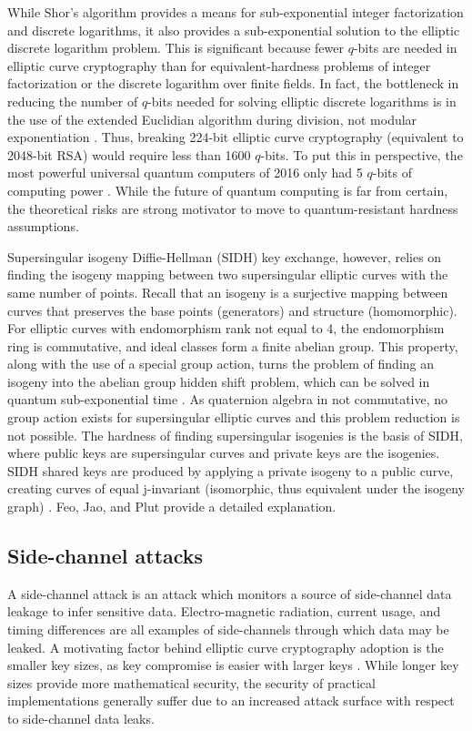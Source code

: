 \documentclass{article}
\begin{document}
    While Shor's algorithm provides a means for sub-exponential integer
    factorization and discrete logarithms, it also provides a sub-exponential
    solution to the elliptic discrete logarithm problem. This is significant
    because fewer $q$-bits are needed in elliptic curve cryptography than for
    equivalent-hardness problems of integer factorization or the discrete
    logarithm over finite fields. In fact, the bottleneck in reducing the
    number of $q$-bits needed for solving elliptic discrete logarithms is in
    the use of the extended Euclidian algorithm during division, not modular
    exponentiation \cite{proos}.  Thus, breaking 224-bit elliptic curve
    cryptography (equivalent to 2048-bit RSA) would require less than 1600
    $q$-bits. To put this in perspective, the most powerful universal quantum
    computers of 2016 only had 5 $q$-bits of computing power \cite{ibm}. While
    the future of quantum computing is far from certain, the theoretical risks
    are strong motivator to move to quantum-resistant hardness assumptions.

    Supersingular isogeny Diffie-Hellman (SIDH) key exchange, however, relies
    on finding the isogeny mapping between two supersingular elliptic curves
    with the same number of points. Recall that an isogeny is a surjective
    mapping between curves that preserves the base points (generators) and
    structure (homomorphic). For elliptic curves with endomorphism rank not
    equal to 4, the endomorphism ring is commutative, and ideal classes form a
    finite abelian group. This property, along with the use of a special group
    action, turns the problem of finding an isogeny into the abelian group
    hidden shift problem, which can be solved in quantum sub-exponential time
    \cite{childs2007quantum} \cite{childs2014constructing}. As quaternion
    algebra in not commutative, no group action exists for supersingular
    elliptic curves and this problem reduction is not possible. The hardness of
    finding supersingular isogenies is the basis of SIDH, where public keys are
    supersingular curves and private keys are the isogenies. SIDH shared keys
    are produced by applying a private isogeny to a public curve, creating
    curves of equal j-invariant (isomorphic, thus equivalent under the isogeny
    graph) \cite{jao2011towards}. Feo, Jao, and Plut provide a detailed
    explanation.

\subsection{Side-channel attacks}
    A side-channel attack is an attack which monitors a source of side-channel
    data leakage to infer sensitive data. Electro-magnetic radiation, current
    usage, and timing differences are all examples of side-channels through
    which data may be leaked. A motivating factor behind elliptic curve
    cryptography adoption is the smaller key sizes, as key compromise is easier
    with larger keys \cite{walter2003longer} \cite{yarom2014recovering}. While
    longer key sizes provide more mathematical security, the security of
    practical implementations generally suffer due to an increased attack
    surface with respect to side-channel data leaks.
\end{document}
